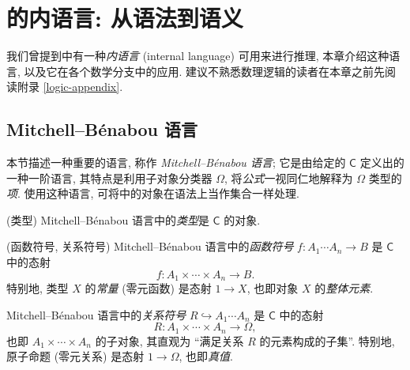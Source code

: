 \chapter{\topos{}的内语言: 从语法到语义}


\minitoc

我们曾提到\topos{}中有一种\emph{内语言} (internal language) 可用来进行推理, 本章介绍这种语言, 以及它在各个数学分支中的应用.
建议不熟悉数理逻辑的读者在本章之前先阅读附录 \ref{logic-appendix}.

\section{Mitchell--B\'enabou 语言}

\label{Mitchell--Benabou-language}

本节描述一种重要的语言, 称作 \emph{Mitchell--B\'enabou 语言}; 它是由给定的\topos{} $\mathsf C$ 定义出的一种一阶语言, 其特点是利用子对象分类器 $\Omega$, 将\emph{公式}一视同仁地解释为 $\Omega$ 类型的\emph{项}. 使用这种语言, 可将\topos{}中的对象在语法上当作集合一样处理.

\begin{definition}
    {(类型)}
    Mitchell--B\'enabou 语言中的\emph{类型}是 $\mathsf C$ 的对象.
\end{definition}




\begin{definition}
	{(函数符号, 关系符号)}
	Mitchell--B\'enabou 语言中的\emph{函数符号} $f\colon A_1\cdots A_n \to B$ 是 $\mathsf C$ 中的态射
	$$f\colon A_1\times\cdots\times A_n\to B.$$
	特别地, 类型 $X$ 的\emph{常量} (零元函数) 是态射 $1 \to X$, 也即对象 $X$ 的\emph{整体元素}.
	
	Mitchell--B\'enabou 语言中的\emph{关系符号} $R\hookrightarrow A_1\cdots A_n$ 是 $\mathsf C$ 中的态射
	$$
	R\colon A_1\times\cdots\times A_n \to \Omega,
	$$
	也即 $A_1\times\cdots\times A_n$ 的子对象, 其直观为 ``满足关系 $R$ 的元素构成的子集''.
	特别地, 原子命题 (零元关系) 是态射 $1\to\Omega$, 也即\emph{真值}.
	
\end{definition}


